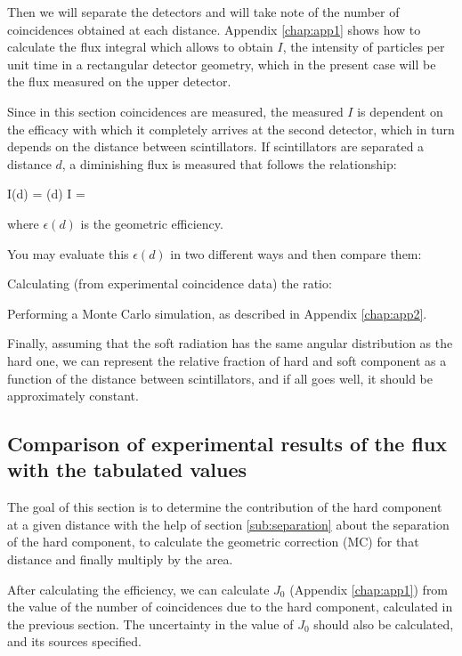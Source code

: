 Then we will separate the detectors and will take note of the number of coincidences obtained at each distance. Appendix \ref{chap:app1} shows how to calculate the flux integral which allows to obtain $I$, the intensity of particles per unit time in a rectangular detector geometry, which in the present case will be the flux measured on the upper detector.

Since in this section coincidences are measured, the measured $I$ is dependent on the efficacy with which it completely arrives at the second detector, which in turn depends on the distance between scintillators. If scintillators are separated a distance $d$, a diminishing flux is measured that follows the relationship:

\be I(d) = \epsilon (d) I = \ee

where $\epsilon (d)$ is the geometric efficiency.

You may evaluate this $\epsilon (d)$ in two different ways and then compare them:

\bi
	\item Calculating (from experimental coincidence data) the ratio:
\be{}\ee
	\item Performing a Monte Carlo simulation, as described in  Appendix \ref{chap:app2}.
\ei

Finally, assuming that the soft radiation has the same angular distribution as the hard one, we can represent the relative fraction of hard and soft component as a function of the distance between scintillators, and if all goes well, it should be approximately constant.





\subsection{Comparison of experimental results of the flux with the tabulated values}


The goal of this section is to determine the contribution of the hard component at a given distance with the help of section \ref{sub:separation} about the separation of the hard component, to calculate the geometric correction (MC) for that distance and finally multiply by the area.

After calculating the efficiency, we can calculate $J_0$ (Appendix \ref{chap:app1}) from the value of the number of coincidences due to the hard component, calculated in the previous section. The uncertainty in the value of $J_0$ should also be calculated, and its sources specified.

